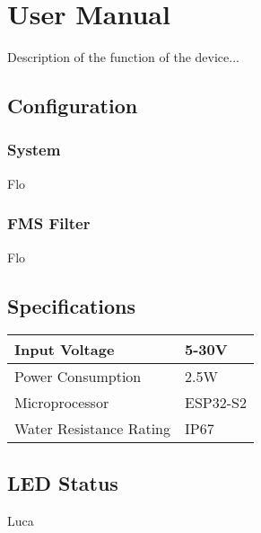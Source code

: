 \chapter{User Manual}

Description of the function of the device...

\section{Configuration}
\subsection{System}
Flo
\subsection{FMS Filter}
Flo

\section{Specifications}
\begin{center}
    \begin{tabular}{p{6cm} p{4cm}}
    \hline
    Input Voltage           & 5-30V         \\ \hline
    Power Consumption       & 2.5W          \\ \hline
    Microprocessor          & ESP32-S2      \\ \hline
    Water Resistance Rating & IP67          \\ \hline       
    \end{tabular}
\end{center}


\section{LED Status}
Luca

